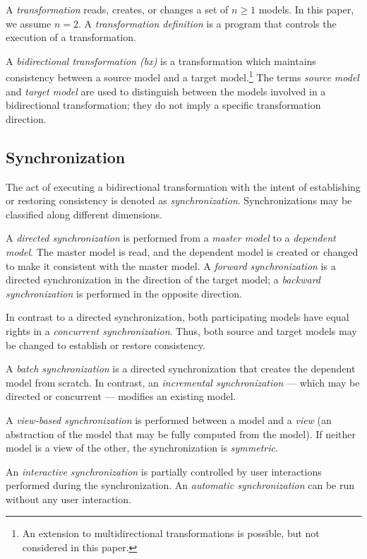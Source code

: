 A \emph{transformation} reads, creates, or changes a set of $n \geq 1$ models. In this paper, we assume $n = 2$. 
A \emph{transformation definition} is a program that controls the execution of a transformation.

A \emph{bidirectional transformation (bx)} is a transformation which maintains consistency between a source model and a target model.\footnote{An extension to multidirectional transformations is possible, but not considered in this paper.} 
The terms \emph{source model} and \emph{target model} are used to distinguish between the models involved in a bidirectional transformation; they do not imply a specific transformation direction.

\subsection{Synchronization}
\label{sec:Synchronization}

The act of executing a bidirectional transformation with the intent of establishing or restoring consistency is denoted as \emph{synchronization}. 
Synchronizations may be classified along different dimensions.

A \emph{directed synchronization} is performed from a \emph{master model} to a \emph{dependent model}. The master model is read, and the dependent model is created or changed to make it consistent with the master model. A \emph{forward synchronization} is a directed synchronization in the direction of the target model; a \emph{backward synchronization} is performed in the opposite direction.

In contrast to a directed synchronization, both participating models have equal rights in a \emph{concurrent synchronization}. Thus, both source and target models may be changed to establish or restore consistency.

A \emph{batch synchronization} is a directed synchronization that creates the dependent model from scratch. In contrast, an \emph{incremental synchronization} --- which may be directed or concurrent --- modifies an existing model.

A \emph{view-based synchronization} is performed between a model and a \emph{view} (an abstraction of the model that may be fully computed from the model). If neither model is a view of the other, the synchronization is \emph{symmetric}. 

An \emph{interactive synchronization} is partially controlled by user interactions performed during the synchronization. An \emph{automatic synchronization} can be run without any user interaction.

